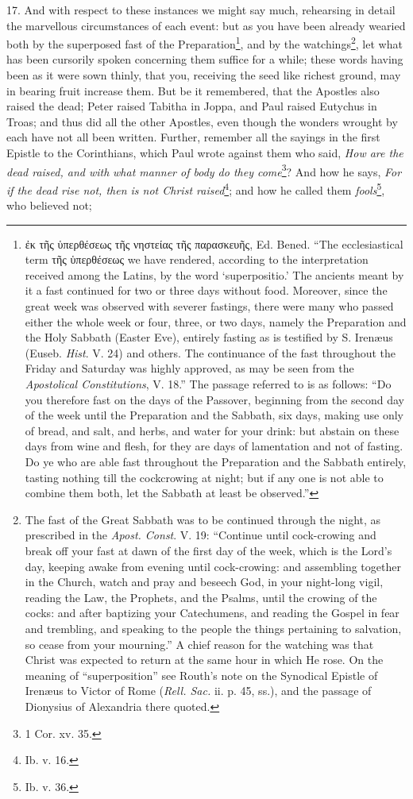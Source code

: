 17. And with respect to these instances we might say much, rehearsing in detail the marvellous circumstances of each event: but as you have been already wearied both by the superposed fast of the Preparation\footnote{\textgreek{ἐκ τῆς ὑπερθέσεως τῆς νηστείας τῆς παρασκευῆς}, Ed. Bened. “The ecclesiastical term \textgreek{τῆς ὑπερθέσεως} we have rendered, according to the interpretation received among the Latins, by the word ‘superpositio.’ The ancients meant by it a fast continued for two or three days without food. Moreover, since the great week was observed with severer fastings, there were many who passed either the whole week or four, three, or two days, namely the Preparation and the Holy Sabbath (Easter Eve), entirely fasting as is testified by S. Irenæus (Euseb. \emph{Hist}. V. 24) and others. The continuance of the fast throughout the Friday and Saturday was highly approved, as may be seen from the \emph{Apostolical Constitutions}, V. 18.” The passage referred to is as follows: “Do you therefore fast on the days of the Passover, beginning from the second day of the week until the Preparation and the Sabbath, six days, making use only of bread, and salt, and herbs, and water for your drink: but abstain on these days from wine and flesh, for they are days of lamentation and not of fasting. Do ye who are able fast throughout the Preparation and the Sabbath entirely, tasting nothing till the cockcrowing at night; but if any one is not able to combine them both, let the Sabbath at least be observed.”}, and by the watchings\footnote{The fast of the Great Sabbath was to be continued through the night, as prescribed in the \emph{Apost. Const}. V. 19: “Continue until cock-crowing and break off your fast at dawn of the first day of the week, which is the Lord’s day, keeping awake from evening until cock-crowing: and assembling together in the Church, watch and pray and beseech God, in your night-long vigil, reading the Law, the Prophets, and the Psalms, until the crowing of the cocks: and after baptizing your Catechumens, and reading the Gospel in fear and trembling, and speaking to the people the things pertaining to salvation, so cease from your mourning.” A chief reason for the watching was that Christ was expected to return at the same hour in which He rose. On the meaning of “superposition” see Routh’s note on the Synodical Epistle of Irenæus to Victor of Rome (\emph{Rell. Sac.} ii. p. 45, ss.), and the passage of Dionysius of Alexandria there quoted.}, let what has been cursorily spoken concerning them suffice for a while; these words having been as it were sown thinly, that you, receiving the seed like richest ground, may in bearing fruit increase them. But be it remembered, that the Apostles also raised the dead; Peter raised Tabitha in Joppa, and Paul raised Eutychus in Troas; and thus did all the other Apostles, even though the wonders wrought by each have not all been written. Further, remember all the sayings in the first Epistle to the Corinthians, which Paul wrote against them who said, \emph{How are the dead raised, and with} \emph{what manner of body do they come}\footnote{1 Cor. xv. 35.}? And how he says, \emph{For if the dead rise not, then is not Christ raised}\footnote{Ib. v. 16.}; and how he called them \emph{fools}\footnote{Ib. v. 36.}, who believed not; 